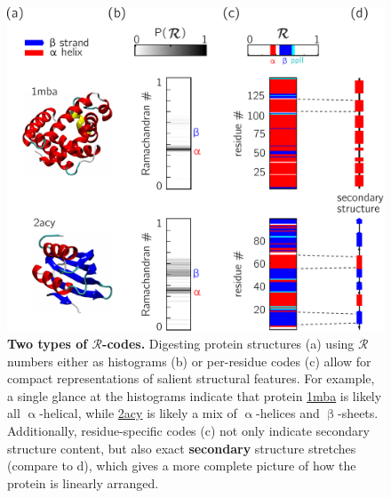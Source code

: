\documentclass[fleqn,10pt,lineno]{wlpeerj} %
\newcommand{\n}[1]{{\textbf{\color{red}#1}}}
\begin{document}
\begin{figure}[t!]
\centering
\includegraphics[width=0.65\linewidth]{backmap_fig5.pdf}
\caption{\textbf{Two types of $\mathcal{R}$-codes.} Digesting protein structures (a) using $\mathcal{R}$ numbers either as histograms (b) or per-residue codes (c) allow for compact representations of salient structural features. For example, a single glance at the histograms indicate that protein \href{https://www.rcsb.org/structure/1MBA}{1mba} is likely all $\upalpha$-helical, while \href{https://www.rcsb.org/structure/2ACY}{2acy} is likely a mix of $\upalpha$-helices and $\upbeta$-sheets. Additionally, residue-specific codes (c) not only indicate secondary structure content, but also exact \n{secondary} structure stretches (compare to d), which gives a more complete picture of how the protein is linearly arranged. \label{fig:simple_stacks}} 
\end{figure}

\end{document}
